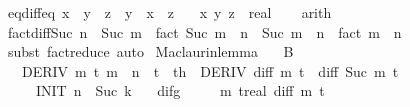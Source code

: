 \begin{isabellebody}
\endisatagproof
{\isafoldproof}%
%
\isadelimproof
\isanewline
%
\endisadelimproof
\isanewline
{}\isamarkupfalse%
\ eq{\isacharunderscore}{\kern0pt}diff{\isacharunderscore}{\kern0pt}eq{\isacharprime}{\kern0pt}{\isacharcolon}{\kern0pt}\ {\isachardoublequoteopen}x\ {\isacharequal}{\kern0pt}\ y\ {\isacharminus}{\kern0pt}\ z\ {\isasymlongleftrightarrow}\ y\ {\isacharequal}{\kern0pt}\ x\ {\isacharplus}{\kern0pt}\ z{\isachardoublequoteclose}\isanewline
\ \ \ x\ y\ z\ {\isacharcolon}{\kern0pt}{\isacharcolon}{\kern0pt}\ real\isanewline
%
\isadelimproof
\ \ %
\endisadelimproof
%
\isatagproof
{}\isamarkupfalse%
\ arith%
\endisatagproof
{\isafoldproof}%
%
\isadelimproof
\isanewline
%
\endisadelimproof
\isanewline
{}\isamarkupfalse%
\ fact{\isacharunderscore}{\kern0pt}diff{\isacharunderscore}{\kern0pt}Suc{\isacharcolon}{\kern0pt}\ {\isachardoublequoteopen}n\ {\isacharless}{\kern0pt}\ Suc\ m\ {\isasymLongrightarrow}\ fact\ {\isacharparenleft}{\kern0pt}Suc\ m\ {\isacharminus}{\kern0pt}\ n{\isacharparenright}{\kern0pt}\ {\isacharequal}{\kern0pt}\ {\isacharparenleft}{\kern0pt}Suc\ m\ {\isacharminus}{\kern0pt}\ n{\isacharparenright}{\kern0pt}\ {\isacharasterisk}{\kern0pt}\ fact\ {\isacharparenleft}{\kern0pt}m\ {\isacharminus}{\kern0pt}\ n{\isacharparenright}{\kern0pt}{\isachardoublequoteclose}\isanewline
%
\isadelimproof
\ \ %
\endisadelimproof
%
\isatagproof
{}\isamarkupfalse%
\ {\isacharparenleft}{\kern0pt}subst\ fact{\isacharunderscore}{\kern0pt}reduce{\isacharparenright}{\kern0pt}\ auto%
\endisatagproof
{\isafoldproof}%
%
\isadelimproof
\isanewline
%
\endisadelimproof
\isanewline
{}\isamarkupfalse%
\ Maclaurin{\isacharunderscore}{\kern0pt}lemma{}{\isacharcolon}{\kern0pt}\isanewline
\ \ \ B\isanewline
\ \ \ DERIV{\isacharcolon}{\kern0pt}\ {\isachardoublequoteopen}{\isasymforall}m\ t{\isachardot}{\kern0pt}\ m\ {\isacharless}{\kern0pt}\ n\ {\isasymand}\ {}{\isasymle}t\ {\isasymand}\ t{\isasymle}h\ {\isasymlongrightarrow}\ DERIV\ {\isacharparenleft}{\kern0pt}diff\ m{\isacharparenright}{\kern0pt}\ t\ {\isacharcolon}{\kern0pt}{\isachargreater}{\kern0pt}\ diff\ {\isacharparenleft}{\kern0pt}Suc\ m{\isacharparenright}{\kern0pt}\ t{\isachardoublequoteclose}\isanewline
\ \ \ \ \ INIT{\isacharcolon}{\kern0pt}\ {\isachardoublequoteopen}n\ {\isacharequal}{\kern0pt}\ Suc\ k{\isachardoublequoteclose}\isanewline
\ \ \ {\isachardoublequoteopen}difg\ {\isasymequiv}\isanewline
\ \ \ \ {\isacharparenleft}{\kern0pt}{\isasymlambda}m\ t{\isacharcolon}{\kern0pt}{\isacharcolon}{\kern0pt}real{\isachardot}{\kern0pt}\ diff\ m\ t\ {\isacharminus}{\kern0pt}\isanewline

\end{isabellebody}
